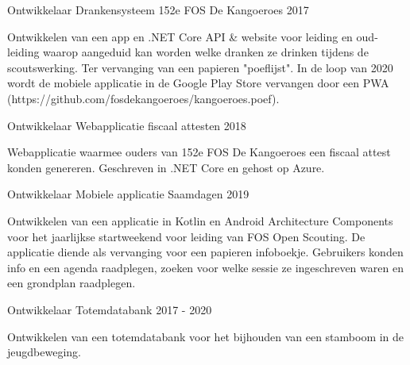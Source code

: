 


\begin{cventries}


\cventry
{Ontwikkelaar} %
{Drankensysteem 152e FOS De Kangoeroes} %
{} %
{2017} %
{ 
\begin{cvitems}
\item {Ontwikkelen van een app en .NET Core API \& website voor leiding en oud-leiding waarop aangeduid kan worden welke dranken ze drinken tijdens de scoutswerking. Ter vervanging van een papieren "poeflijst". In de loop van 2020 wordt de mobiele applicatie in de Google Play Store vervangen door een PWA (https://github.com/fosdekangoeroes/kangoeroes.poef).}
\end{cvitems}
}

\cventry
{Ontwikkelaar} %
{Webapplicatie fiscaal attesten} %
{}
{2018} %
{ 
\begin{cvitems}
\item {Webapplicatie waarmee ouders van 152e FOS De Kangoeroes een fiscaal attest konden genereren. Geschreven in .NET Core en gehost op Azure.}
\end{cvitems}
}

\cventry
{Ontwikkelaar} %
{Mobiele applicatie Saamdagen} %
{}
{2019} %
{ 
\begin{cvitems}
\item {Ontwikkelen van een applicatie in Kotlin en Android Architecture Components voor het jaarlijkse startweekend voor leiding van FOS Open Scouting. De applicatie diende als vervanging voor een papieren infoboekje. Gebruikers konden info en een agenda raadplegen, zoeken voor welke sessie ze ingeschreven waren en een grondplan raadplegen.}
\end{cvitems}
}

\cventry
{Ontwikkelaar} %
{Totemdatabank} %
{}
{2017 - 2020}
{
\begin{cvitems}
    \item {Ontwikkelen van een totemdatabank voor het bijhouden van een stamboom in de jeugdbeweging.}
\end{cvitems}
}


\end{cventries}
